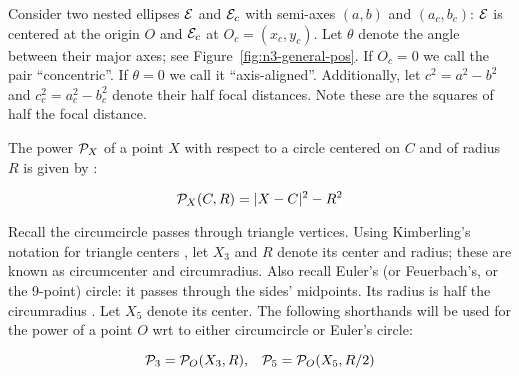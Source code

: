 


Consider two nested ellipses $\E$ and $\E_c$ with semi-axes $(a,b)$ and $(a_c,b_c)$: $\E$ is centered at the origin $O$ and $\E_c$ at $O_c=(x_c,y_c)$. Let $\theta$ denote the angle between their major axes; see Figure~\ref{fig:n3-general-pos}. If $O_c=0$ we call the pair ``concentric''. If $\theta=0$ we call it ``axis-aligned''. Additionally, let $c^2={a^2-b^2}$ and $c_c^2={a_c^2-b_c^2}$ denote their half focal distances. Note these are the squares of half the focal distance.

\begin{definition}
The power $\P_X$ of a point $X$ with respect to a circle centered on $C$ and of radius $R$ is given by \cite[Circle Power]{mw}:

\[ \P_X(C,R) = |X-C|^2-R^2 \]
\end{definition}

Recall the circumcircle passes through triangle vertices. Using Kimberling's notation for triangle centers \cite{etc}, let $X_3$ and $R$ denote its center and radius; these are known as circumcenter and circumradius. Also recall Euler's (or Feuerbach's, or the 9-point) circle: it passes through the sides' midpoints. Its radius is half the circumradius \cite[Nine-point circle]{mw}. Let $X_5$ denote its center. The following shorthands will be used for the power of a point $O$ wrt to either circumcircle or Euler's circle:

\[ \P_3 = \P_{O}(X_3,R),\;\;\;\P_5 = \P_{O}(X_5,R/2) \]
